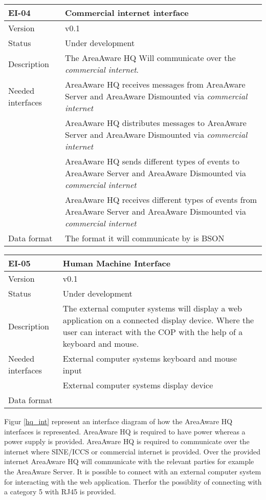\begin{longtable}{| p{3.5cm} |  p{10cm} | }
	\hline
	\textbf{EI-04} &  \textbf{Commercial internet interface} \\
	\hline
	Version & v0.1 \\
	\hline
	Status & Under development \\
	\hline
	Description & The AreaAware HQ Will communicate over the \emph{commercial internet}.
	\\
	\hline
	Needed interfaces 
	& AreaAware HQ receives messages from AreaAware Server and AreaAware Dismounted via \emph{commercial internet} \\
	& AreaAware HQ distributes messages to AreaAware Server and AreaAware Dismounted via \emph{commercial internet} \\ 
	& AreaAware HQ sends different types of events to AreaAware Server and AreaAware Dismounted via \emph{commercial internet} \\
	& AreaAware HQ receives different types of events from AreaAware Server and AreaAware Dismounted via \emph{commercial internet} \\
	\hline
	Data format
	& The format it will communicate by is BSON \\
	\hline
\end{longtable}

\begin{longtable}{| p{3.5cm} |  p{10cm} | }
	\hline
	\textbf{EI-05} &  \textbf{Human Machine Interface} \\
	\hline
	Version & v0.1 \\
	\hline
	Status & Under development \\
	\hline
	Description & The external computer systems will display a web application on a connected display device. Where the user can interact with the COP with the help of a keyboard and mouse.
	\\
	\hline
	Needed interfaces 
	& External computer systems keyboard and mouse input \\
	& External computer systems display device \\ 
	\hline
	Data format
	&  \\
	\hline
\end{longtable}
\clearpage
{} 

Figur \ref{hq_int} represent an interface diagram of how the AreaAware HQ interfaces is represented. AreaAware HQ is required to have power whereas a power supply is provided. AreaAware HQ is required to communicate over the internet where SINE/ICCS or commercial internet is provided. Over the provided internet AreaAware HQ will communicate with the relevant parties for example the AreaAware Server. It is possible to connect with an external computer system for interacting with the web application. Therfor the possiblity of connecting with a category 5 with RJ45 is provided. 


